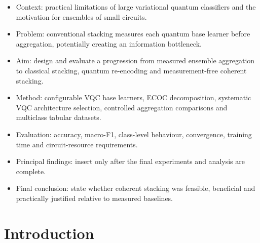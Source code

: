 \documentclass[]{UCD_CS_MSc_AAI_Report}
\begin{document}
\maketitle

\tableofcontents
\newpage

\abstract

\begin{itemize}
    \item Context: practical limitations of large variational quantum classifiers and the motivation for ensembles of small circuits.
    \item Problem: conventional stacking measures each quantum base learner before aggregation, potentially creating an information bottleneck.
    \item Aim: design and evaluate a progression from measured ensemble aggregation to classical stacking, quantum re-encoding and measurement-free coherent stacking.
    \item Method: configurable VQC base learners, ECOC decomposition, systematic VQC architecture selection, controlled aggregation comparisons and multiclass tabular datasets.
    \item Evaluation: accuracy, macro-F1, class-level behaviour, convergence, training time and circuit-resource requirements.
    \item Principal findings: insert only after the final experiments and analysis are complete.
    \item Final conclusion: state whether coherent stacking was feasible, beneficial and practically justified relative to measured baselines.
\end{itemize}


\chapter{Introduction}
\label{chap:introduction}
\end{document}
